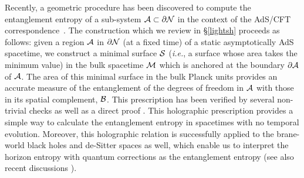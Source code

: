 \documentclass[12pt]{article}
\def\sec#1{\S \;\ref{#1}}
\def\ie{{\it i.e.}}
\def\p{\partial}
\def\CA{{\cal A}}
\def\CB{{\cal B}}
\def\CS{{\cal S}}
\def\p{\partial}
\def\p{\partial}
\def\bulk{{\cal M}}
\def\bdys{\p{\cal N}}
\def\ms{\CS}
\def\rA{\CA}
\def\rB{\CB}
\def\brA{\p \CA}
\begin{document}
Recently,  a geometric procedure has been discovered to compute the
entanglement entropy of a sub-system $\rA \subset \bdys$ in the
context of the AdS/CFT correspondence~\cite{Ryu:2006bv,Ryu:2006ef}.
The construction which we review in \sec{lightsh} proceeds as
follows: given a region $\rA$ in $\bdys$ (at a fixed time) of a
static asymptotically AdS spacetime, we construct a minimal surface
$\ms$ (\ie, a surface whose area takes the minimum value) in the
bulk spacetime $\bulk$ which is anchored at the boundary $\brA$ of
$\rA$. The area of  this minimal surface in the bulk Planck units
provides an accurate measure of the entanglement of the degrees of
freedom in $\rA$ with those in its spatial complement, $\rB$. This
prescription has been verified by several non-trivial checks
\cite{Ryu:2006bv, Ryu:2006ef, Hirata:2006jx, Nishioka:2006gr,Matt}
as well as a direct proof \cite{Fursaev:2006ih}. This holographic
prescription provides a simple way to calculate the entanglement
entropy in spacetimes with no temporal evolution. Moreover, this
holographic relation is successfully applied to the brane-world
black holes \cite{Emparan:2006ni, Solodukhin:2006xv} and de-Sitter
spaces \cite{Iwashita:2006zj} as well, which enable us to interpret
the horizon entropy with quantum corrections as the entanglement
entropy (see also recent discussions \cite{Casini:2006ws,
Lee:2007zq, Cadoni:2007vf}).
\end{document}
